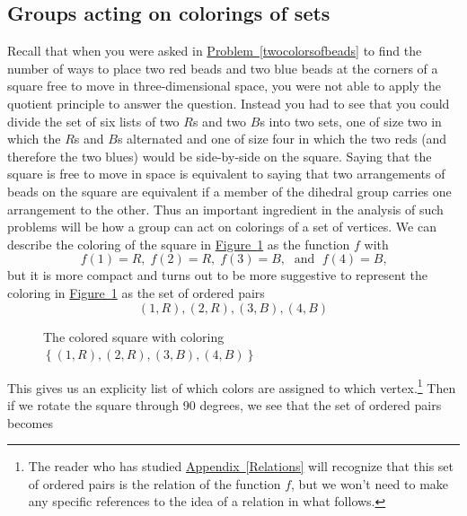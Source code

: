 \documentclass[10pt,]{book}
\theoremstyle{plain}
\theoremstyle{definition}
\theoremstyle{definition}
\numberwithin{equation}{chapter}
\begin{document}
\subsection[{Groups acting on colorings of sets}]{Groups acting on colorings of sets}\label{subsection-65}
Recall that when you were asked in \hyperref[twocolorsofbeads]{Problem~\ref{twocolorsofbeads}} to find the number of ways to place two red beads and two blue beads at the corners of a square free to move in three-dimensional space, you were not able to apply the quotient principle to answer the question. Instead you had to see that you could divide the set of six lists of two \(R\)s and two \(B\)s into two sets, one of size two in which the \(R\)s and \(B\)s alternated and one of size four in which the two reds (and therefore the two blues) would be side-by-side on the square. Saying that the square is free to move in space is equivalent to saying that two arrangements of beads on the square are equivalent if a member of the dihedral group carries one arrangement to the other. Thus an important ingredient in the analysis of such problems will be how a group can act on colorings of a set of vertices. We can describe the coloring of the square in \hyperref[colored-square]{Figure~\ref{colored-square}} as the function \(f\) with%
\begin{equation*}
f(1)=R,\; f(2)=R, \; f(3)=B,\;\text{ and }\;f(4)=B\text{,}
\end{equation*}
but it is more compact and turns out to be more suggestive to represent the coloring in \hyperref[colored-square]{Figure~\ref{colored-square}} as the set of ordered pairs%
\begin{equation}
(1,R), (2,R), (3,B), (4,B)\label{coloring-pairs}
\end{equation}
%
\begin{figure}
\centering
{
}
\caption{The colored square with coloring \(\left\{(1,R),(2,R),(3,B),(4,B)\right\}\)\label{colored-square}}
\end{figure}
This gives us an explicity list of which colors are assigned to which vertex.\footnote{The reader who has studied \hyperref[Relations]{Appendix~\ref{Relations}} will recognize that this set of ordered pairs is the relation of the function \(f\), but we won't need to make any specific references to the idea of a relation in what follows.\label{fn-22}} Then if we rotate the square through 90 degrees, we see that the set of ordered pairs becomes%
\end{document}
